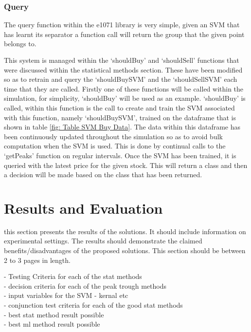 \documentclass[conference]{IEEEtran}
\begin{document}
\subsubsection{Query}

The query function within the e1071 library is very simple, given an SVM that has learnt its separator a function call will return the group that the given point belongs to.

This system is managed within the `shouldBuy' and `shouldSell' functions that were discussed within the statistical methods section. These have been modified so as to retrain and query the `shouldBuySVM' and the `shouldSellSVM' each time that they are called. Firstly one of these functions will be called within the simulation, for simplicity, `shouldBuy' will be used as an example. `shouldBuy' is called, within this function is the call to create and train the SVM associated with this function, namely `shouldBuySVM', trained on the dataframe that is shown in table \ref{fig: Table SVM Buy Data}. The data within this dataframe has been continuously updated throughout the simulation so as to avoid bulk computation when the SVM is used. This is done by continual calls to the `getPeaks' function on regular intervals. Once the SVM has been trained, it is queried with the latest price for the given stock. This will return a class and then a decision will be made based on the class that has been returned.

\section{Results and Evaluation}

\iffalse
this section presents the results of the solutions.  It should include information on experimental settings.  The results should demonstrate the claimed benefits/disadvantages of the proposed solutions.
This section should be between 2 to 3 pages in length.

- Testing Criteria for each of the stat methods\\
- decision criteria for each of the peak trough methods\\
- input variables for the SVM - kernal etc \\
- conjunction test criteria for each of the good stat methods\\
- best stat method result possible\\
- best ml method result possible
\end{document}
